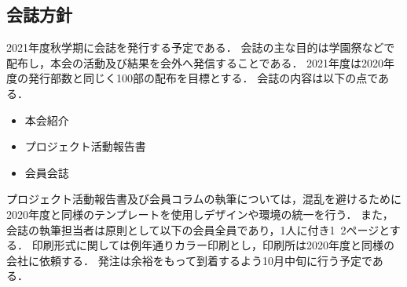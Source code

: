 \subsection*{会誌方針}

2021年度秋学期に会誌を発行する予定である．
会誌の主な目的は学園祭などで配布し，本会の活動及び結果を会外へ発信することである．
2021年度は2020年度の発行部数と同じく100部の配布を目標とする．
会誌の内容は以下の点である．
\begin{itemize}
	\item 本会紹介
	\item プロジェクト活動報告書
	\item 会員会誌
\end{itemize}
プロジェクト活動報告書及び会員コラムの執筆については，混乱を避けるために2020年度と同様のテンプレートを使用しデザインや環境の統一を行う．
また，会誌の執筆担当者は原則として\thirdGrade{}以下の会員全員であり，1人に付き1~2ページとする．
印刷形式に関しては例年通りカラー印刷とし，印刷所は2020年度と同様の会社に依頼する．
発注は余裕をもって到着するよう10月中旬に行う予定である．

